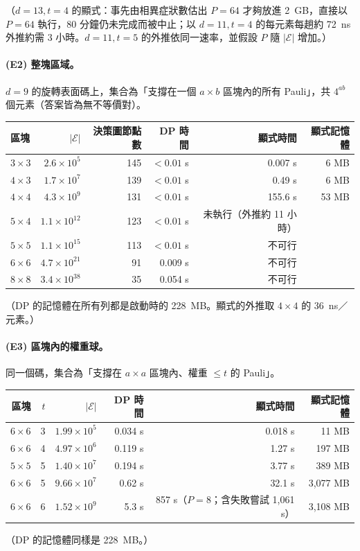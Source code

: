 \documentclass[a4paper,11pt,fontset=none]{ctexart}
\newcommand{\E}{\mathcal{E}}
\theoremstyle{definition}
\begin{document}
\noindent（$d{=}13,t{=}4$ 的顯式：事先由相異症狀數估出 $P=64$ 才夠放進 2~GB，直接以 $P=64$ 執行，80 分鐘仍未完成而被中止；以 $d{=}11,t{=}4$ 的每元素每趟約 72~ns 外推約需 3 小時。$d{=}11,t{=}5$ 的外推依同一速率，並假設 $P$ 隨 $\lvert\E\rvert$ 增加。）

\paragraph{(E2) 整塊區域。}$d{=}9$ 的旋轉表面碼上，集合為「支撐在一個 $a\times b$ 區塊內的所有 Pauli」，共 $4^{ab}$ 個元素（答案皆為無不等價對）。
\begin{center}
\small
\begin{tabular}{@{}lrrrrr@{}}
\toprule
區塊 & $\lvert\E\rvert$ & 決策圖節點數 & DP 時間 & 顯式時間 & 顯式記憶體\\
\midrule
$3\times3$ & $2.6\times10^5$ & 145 & $<0.01$ s & 0.007 s & 6 MB\\
$4\times3$ & $1.7\times10^7$ & 139 & $<0.01$ s & 0.49 s & 6 MB\\
$4\times4$ & $4.3\times10^9$ & 131 & $<0.01$ s & 155.6 s & 53 MB\\
$5\times4$ & $1.1\times10^{12}$ & 123 & $<0.01$ s & 未執行（外推約 11 小時） & \\
$5\times5$ & $1.1\times10^{15}$ & 113 & $<0.01$ s & 不可行 & \\
$6\times6$ & $4.7\times10^{21}$ & 91 & 0.009 s & 不可行 & \\
$8\times8$ & $3.4\times10^{38}$ & 35 & 0.054 s & 不可行 & \\
\bottomrule
\end{tabular}
\end{center}
（DP 的記憶體在所有列都是啟動時的 228~MB。顯式的外推取 $4\times4$ 的 36~ns／元素。）

\paragraph{(E3) 區塊內的權重球。}同一個碼，集合為「支撐在 $a\times a$ 區塊內、權重 $\le t$ 的 Pauli」。
\begin{center}
\small
\begin{tabular}{@{}rrrrrr@{}}
\toprule
區塊 & $t$ & $\lvert\E\rvert$ & DP 時間 & 顯式時間 & 顯式記憶體\\
\midrule
$6\times6$ & 3 & $1.99\times10^5$ & 0.034 s & 0.018 s & 11 MB\\
$6\times6$ & 4 & $4.97\times10^6$ & 0.119 s & 1.27 s & 197 MB\\
$5\times5$ & 5 & $1.40\times10^7$ & 0.194 s & 3.77 s & 389 MB\\
$6\times6$ & 5 & $9.66\times10^7$ & 0.62 s & 32.1 s & 3,077 MB\\
$6\times6$ & 6 & $1.52\times10^9$ & 5.3 s & 857 s（$P=8$；含失敗嘗試 1,061 s） & 3,108 MB\\
\bottomrule
\end{tabular}
\end{center}
（DP 的記憶體同樣是 228~MB。）
\end{document}
